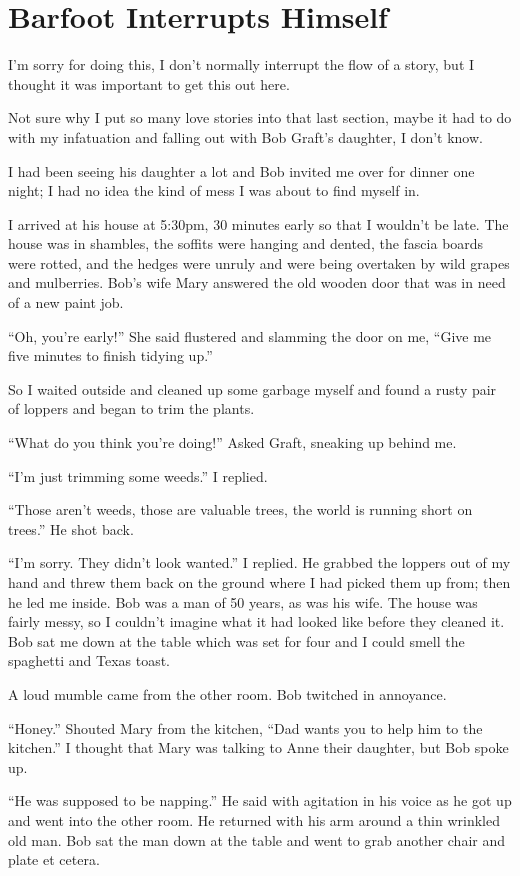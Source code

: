 \section{Barfoot Interrupts Himself}
I'm sorry for doing this, I don't normally interrupt the flow of a story, but I thought it was important to get this out here.

Not sure why I put so many love stories into that last section, maybe it had to do with my infatuation and falling out with Bob Graft's daughter, I don't know.

I had been seeing his daughter a lot and Bob invited me over for dinner one night; I had no idea the kind of mess I was about to find myself in.

I arrived at his house at 5:30pm, 30 minutes early so that I wouldn't be late. The house was in shambles, the soffits were hanging and dented, the fascia boards were rotted, and the hedges were unruly and were being overtaken by wild grapes and mulberries. Bob's wife Mary answered the old wooden door that was in need of a new paint job.

``Oh, you're early!'' She said flustered and slamming the door on me, ``Give me five minutes to finish tidying up.''

So I waited outside and cleaned up some garbage myself and found a rusty pair of loppers and began to trim the plants.

``What do you think you're doing!'' Asked Graft, sneaking up behind me.

``I'm just trimming some weeds.'' I replied.

``Those aren't weeds, those are valuable trees, the world is running short on trees.'' He shot back.

``I'm sorry. They didn't look wanted.'' I replied. He grabbed the loppers out of my hand and threw them back on the ground where I had picked them up from; then he led me inside. Bob was a man of 50 years, as was his wife.
The house was fairly messy, so I couldn't imagine what it had looked like before they cleaned it.
Bob sat me down at the table which was set for four and I could smell the spaghetti and Texas toast.

A loud mumble came from the other room. Bob twitched in annoyance.

``Honey.'' Shouted Mary from the kitchen, ``Dad wants you to help him to the kitchen.''
I thought that Mary was talking to Anne their daughter, but Bob spoke up.

``He was supposed to be napping.'' He said with agitation in his voice as he got up and went into the other room. He returned with his arm around a thin wrinkled old man. Bob sat the man down at the table and went to grab another chair and plate et cetera.

